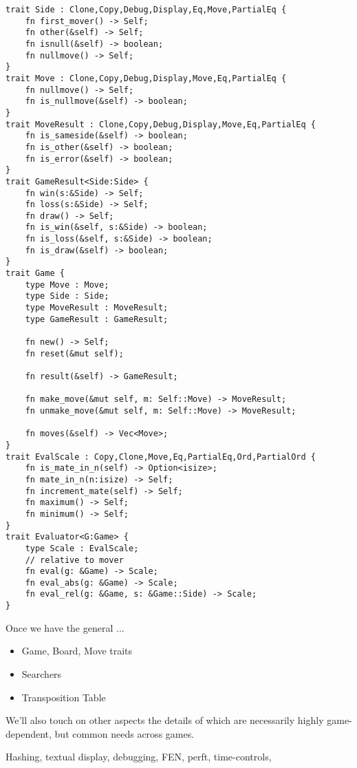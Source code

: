 \documentclass[10pt,dvipdfmx,letterpaper]{report}
\begin{document}
{\scriptsize
\begin{verbatim}
trait Side : Clone,Copy,Debug,Display,Eq,Move,PartialEq {
    fn first_mover() -> Self;
    fn other(&self) -> Self;
    fn isnull(&self) -> boolean;
    fn nullmove() -> Self;
}
trait Move : Clone,Copy,Debug,Display,Move,Eq,PartialEq {
    fn nullmove() -> Self;
    fn is_nullmove(&self) -> boolean;
}
trait MoveResult : Clone,Copy,Debug,Display,Move,Eq,PartialEq {
    fn is_sameside(&self) -> boolean;
    fn is_other(&self) -> boolean;
    fn is_error(&self) -> boolean;
}
trait GameResult<Side:Side> {
    fn win(s:&Side) -> Self;
    fn loss(s:&Side) -> Self;
    fn draw() -> Self;
    fn is_win(&self, s:&Side) -> boolean;
    fn is_loss(&self, s:&Side) -> boolean;
    fn is_draw(&self) -> boolean;
}
trait Game {
    type Move : Move;
    type Side : Side;
    type MoveResult : MoveResult;
    type GameResult : GameResult;

    fn new() -> Self;
    fn reset(&mut self);

    fn result(&self) -> GameResult;

    fn make_move(&mut self, m: Self::Move) -> MoveResult;
    fn unmake_move(&mut self, m: Self::Move) -> MoveResult;

    fn moves(&self) -> Vec<Move>;
}
trait EvalScale : Copy,Clone,Move,Eq,PartialEq,Ord,PartialOrd {
    fn is_mate_in_n(self) -> Option<isize>;
    fn mate_in_n(n:isize) -> Self;
    fn increment_mate(self) -> Self;
    fn maximum() -> Self;
    fn minimum() -> Self;
}
trait Evaluator<G:Game> {
    type Scale : EvalScale;
    // relative to mover
    fn eval(g: &Game) -> Scale;
    fn eval_abs(g: &Game) -> Scale;
    fn eval_rel(g: &Game, s: &Game::Side) -> Scale;
}
\end{verbatim}
}

Once we have the general ...

\begin{itemize}
    \item Game, Board, Move traits
    \item Searchers
    \item Transposition Table
\end{itemize}

We'll also touch on other aspects the details of which are necessarily
highly game-dependent, but common needs across games.

Hashing, textual display, debugging, FEN,
perft, time-controls, 



\end{document}
